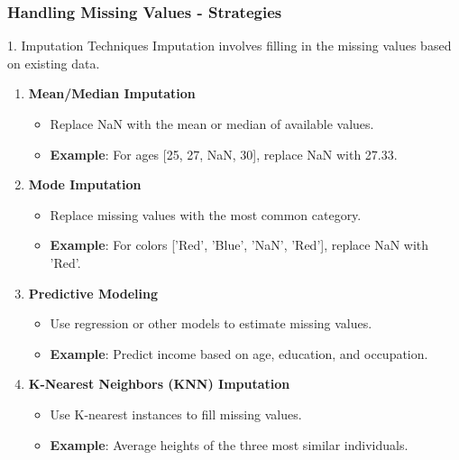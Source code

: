 \documentclass[aspectratio=169]{beamer}
\begin{document}
\begin{frame}[fragile]
    \frametitle{Handling Missing Values - Strategies}
    \begin{block}{1. Imputation Techniques}
        Imputation involves filling in the missing values based on existing data.
        \begin{enumerate}
            \item \textbf{Mean/Median Imputation}
            \begin{itemize}
                \item Replace NaN with the mean or median of available values.
                \item \textbf{Example}: For ages [25, 27, NaN, 30], replace NaN with 27.33.
            \end{itemize}
            
            \item \textbf{Mode Imputation}
            \begin{itemize}
                \item Replace missing values with the most common category.
                \item \textbf{Example}: For colors ['Red', 'Blue', 'NaN', 'Red'], replace NaN with 'Red'.
            \end{itemize}
            
            \item \textbf{Predictive Modeling}
            \begin{itemize}
                \item Use regression or other models to estimate missing values.
                \item \textbf{Example}: Predict income based on age, education, and occupation.
            \end{itemize}
            
            \item \textbf{K-Nearest Neighbors (KNN) Imputation}
            \begin{itemize}
                \item Use K-nearest instances to fill missing values.
                \item \textbf{Example}: Average heights of the three most similar individuals.
            \end{itemize}
        \end{enumerate}
    \end{block}
\end{frame}
\end{document}
